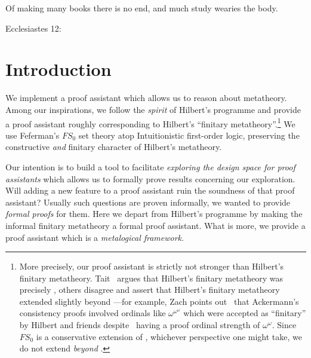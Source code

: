 \setlength{\epigraphwidth}{0.45\textwidth}
\epigraph{Of making many books there is no end,
and much study wearies the body.}{Ecclesiastes 12\hair:}
\setlength{\epigraphwidth}{0.4\textwidth}

\section{Introduction}

\begin{node}
We implement a proof assistant which allows us to reason about metatheory.
Among our inspirations, we follow the \emph{spirit} of Hilbert's
programme and provide a proof assistant roughly corresponding to
Hilbert's ``finitary metatheory''.\footnote{More precisely, our proof assistant
is strictly not stronger than Hilbert's finitary metatheory. Tait~\cite{tait2002remarks} argues that Hilbert's finitary metatheory was precisely \PRA,
others disagree and assert that Hilbert's finitary metatheory extended
slightly beyond \PRA---for example, Zach points
out~\cite{zach2003practice} that Ackermann's consistency proofs
involved ordinals like $\omega^{\omega^{\omega}}$ which were
accepted as ``finitary'' by Hilbert and friends despite \PRA\ having a
proof ordinal strength of $\omega^{\omega}$. Since $FS_{0}$ is a conservative extension of
\PRA, whichever perspective one might take, we do not extend
\emph{beyond} \PRA.}
We use Feferman's $FS_{0}$ set theory atop Intuitionistic first-order
logic, preserving the constructive \emph{and} finitary character of
Hilbert's metatheory.

Our intention is to build a tool to facilitate \emph{exploring the
design space for proof assistants} which allows us to formally prove
results concerning our exploration. Will adding a new feature to a
proof assistant ruin the soundness of that proof assistant? Usually
such questions are proven informally, we wanted to provide
\emph{formal proofs} for them. Here we depart from Hilbert's programme
by making the informal finitary metatheory a formal proof
assistant. What is more, we provide a proof assistant which is
a \emph{metalogical framework}.
\end{node}

